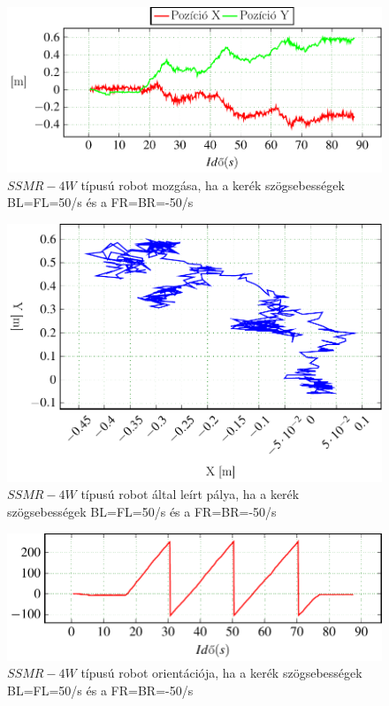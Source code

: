 \begin{figure}[H]
  \includegraphics{tikz/Left_n50Right50a.pdf}
  \caption{$SSMR-4W$ típusú robot mozgása, ha a kerék szögsebességek BL=FL=50\degree/s és a FR=BR=-50\degree/s}
  \label{fig:Left_n50Right50a}
\end{figure}


\begin{figure}[H]
  \includegraphics[scale=1]{tikz/Left_n50Right50b.pdf}
  \caption{$SSMR-4W$ típusú robot által leírt pálya, ha a kerék szögsebességek BL=FL=50\degree/s és a FR=BR=-50\degree/s}
    \label{fig:Left_n50Right50b}
\end{figure}



\begin{figure}[H]
  \includegraphics{tikz/Left_n50Right50c.pdf}
  \caption{$SSMR-4W$ típusú robot orientációja,  ha a kerék szögsebességek BL=FL=50\degree/s és a FR=BR=-50\degree/s}
    \label{fig:Left_n50Right50c}
\end{figure}

